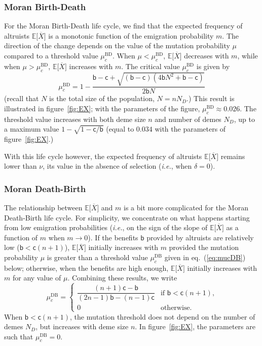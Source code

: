 \documentclass[11pt, letterpaper]{article}
\renewcommand{\eqref}[1]{\textup{{\normalfont eq.~(\ref{#1}}\normalfont)}}
\newcommand{\ie}{\textit{i.e.}}
\newcommand{\Esp}[1]{\mathbb{E}\big[ #1\big]}%
\newcommand{\bb}{\mathsf{b}}
\newcommand{\cc}{\mathsf{c}}
\newcommand{\BD}{\textrm{BD}}
\newcommand{\DB}{\textrm{DB}}
\newcommand{\mutbias}{\nu}
\newcommand{\ndemes}{N_D}
\newcommand{\selstr}{\delta}
\begin{document}
\subsubsection*{Moran Birth-Death}

For the Moran Birth-Death life cycle, we find that the expected frequency of altruists $\Esp{\overline{X}}$ is a monotonic function of the emigration probability $m$. The direction of the change depends on the value of the mutation probability $\mu$ compared to a threshold value $\mu_c^{\BD}$. When $\mu<\mu_c^{\BD}$, $\Esp{\overline{X}}$ decreases with $m$, while when $\mu>\mu_c^{\BD}$, $\Esp{\overline{X}}$  increases with $m$. The critical value $\mu_c^{\BD}$ is given by 
\begin{equation}\label{eq:mucBD}
\mu_c^{\BD} = %
1 - \frac{\bb  - \cc + \sqrt{(\bb - \cc) \left(4 \bb N^2 + \bb - \cc \right)} }{2 \bb N}
\end{equation}
%
(recall that $N$ is the total size of the population, $N=n \ndemes$.) This result is illustrated in figure~\ref{fig:EX}; with the parameters of the figure, $\mu_c^{\BD} \approx 0.026$. The threshold value increases with both deme size $n$ and number of demes $\ndemes$, up to a maximum value $1 - \sqrt{1-\cc/\bb}$ (equal to $0.034$ with the parameters of figure~\ref{fig:EX}.)

With this life cycle however, the expected frequency of altruists $\Esp{\overline{X}}$ remains lower than $\mutbias$, its value in the absence of selection (\ie, when $\selstr =0$). 

\subsubsection*{Moran Death-Birth}

The relationship between $\Esp{\overline{X}}$ and $m$ is a bit more complicated for the Moran Death-Birth life cycle. For simplicity, we concentrate on what happens starting from low emigration probabilities (\ie, on the sign of the slope of $\Esp{\overline{X}}$ as a function of $m$ when $m\to 0$). If the benefits $\bb$ provided by altruists are relatively low ($\bb < \cc (n+1)$), $\Esp{\overline{X}}$ initially increases with $m$ provided the mutation probability $\mu$ is greater than a threshold value $\mu_c^{\DB}$ given in \eqref{eq:mucDB} below; otherwise, when the benefits are high enough, $\Esp{\overline{X}}$ initially increases with $m$ for any value of $\mu$. Combining these results, we write
\begin{equation}\label{eq:mucDB}
\mu_c^{\DB} = \begin{cases}
\dfrac{ (n+1) \cc - \bb}{ (2 n - 1) \bb - (n-1) \cc} & \textrm{if $\bb < \cc (n+1)$,} \\
%
0 & \textrm{otherwise. }
\end{cases}
\end{equation} 
%
When $\bb < \cc (n+1)$, the mutation threshold does not depend on the number of demes $\ndemes$, but increases with deme size $n$. In figure~\ref{fig:EX}, the parameters are such that $\mu_c^{\DB} = 0$. 
\end{document}
